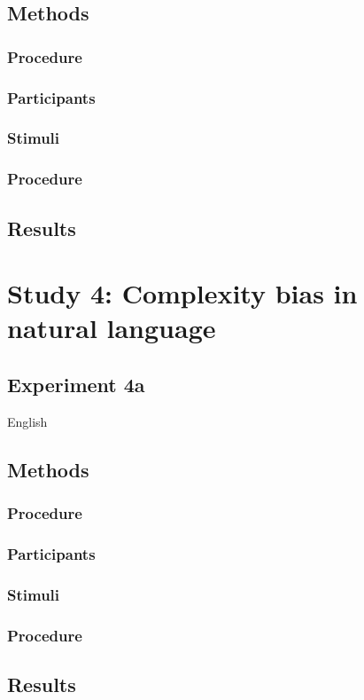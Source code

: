 \documentclass[man]{apa2}
\begin{document}
\subsection{Methods}
\subsubsection{Procedure}
\subsubsection{Participants}
\subsubsection{Stimuli}
\subsubsection{Procedure}
\subsection{Results}


\section{Study 4: Complexity bias in natural language} 
\subsection{\textbf{Experiment 4a}}
English
\subsection{Methods}
\subsubsection{Procedure}
\subsubsection{Participants}
\subsubsection{Stimuli}
\subsubsection{Procedure}
\subsection{Results}
\end{document}
